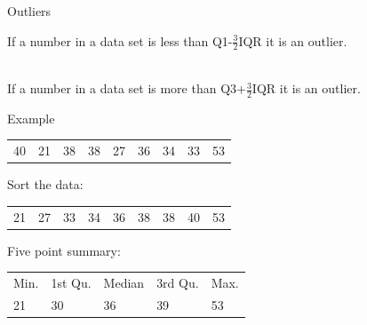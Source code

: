 \begin{frame}{Outliers}

  \begin{definition}[Outliers]

    If a number in a data set is less than Q1-$\frac{3}{2}$IQR it is
    an outlier.

    ~ \\

    If a number in a data set is more than Q3+$\frac{3}{2}$IQR it is
    an outlier.

  \end{definition}
  
\end{frame}

\begin{frame}{Example}

  \begin{tabular}{lllllllll}
    40 & 21 & 38 & 38 & 27 & 36 & 34 & 33 & 53 
  \end{tabular}

  {
    Sort the data: \\
    \begin{tabular}{lllllllll}
      21 & 27 & 33 & 34 & 36 & 38 & 38 & 40 & 53
    \end{tabular}

    \vfill

    Five point summary: \\
    \begin{tabular}{lllll}
      Min. & 1st Qu. & Median    & 3rd Qu. &   Max. \\
      21   & 30      & 36        & 39     & 53
    \end{tabular}

    \vfill
    



  }
  
\end{frame}


